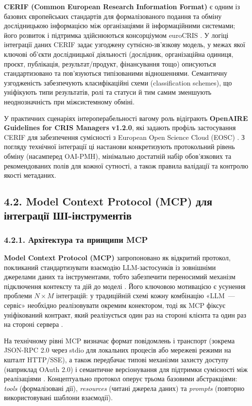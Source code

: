 \textbf{CERIF (Common European Research Information Format)} є одним із базових європейських стандартів для формалізованого подання та обміну дослідницькою інформацією між організаціями й інформаційними системами; його розвиток і підтримка здійснюються консорціумом euroCRIS \cite{euroCRIS2024CERIF}. У логіці інтеграції даних CERIF задає узгоджену сутнісно-зв'язкову модель, у межах якої ключові об'єкти дослідницької діяльності (дослідник, організаційна одиниця, проєкт, публікація, результат/продукт, фінансування тощо) описуються стандартизовано та пов'язуються типізованими відношеннями. Семантичну узгодженість забезпечують класифікаційні схеми (classification schemes), що уніфікують типи результатів, ролі та статуси й тим самим зменшують неоднозначність при міжсистемному обміні.

У практичних сценаріях інтероперабельності вагому роль відіграють \textbf{OpenAIRE Guidelines for CRIS Managers v1.2.0}, які задають профіль застосування CERIF для забезпечення сумісності з European Open Science Cloud (EOSC) \cite{OpenAIRE2023GuidelinesCRIS}. З погляду технічної інтеграції ці настанови конкретизують протокольний рівень обміну (насамперед OAI-PMH), мінімально достатній набір обов'язкових та рекомендованих полів для кожної сутності, а також правила валідації та контролю якості метаданих.

\subsection*{4.2. Model Context Protocol (MCP) для інтеграції ШІ-інструментів}

\subsubsection*{4.2.1. Архітектура та принципи MCP}

\textbf{Model Context Protocol (MCP)} запропоновано як відкритий протокол, покликаний стандартизувати взаємодію LLM-застосунків із зовнішніми джерелами даних та інструментами, тобто забезпечити переносимий механізм підключення контексту та дій до моделі \cite{Anthropic2024MCP}. Його ключовою мотивацією є усунення проблеми $N\times M$ інтеграцій: у традиційній схемі кожну комбінацію «LLM~--- сервіс» необхідно реалізовувати окремим конектором, тоді як MCP фіксує уніфікований контракт, який реалізується один раз на стороні клієнта та один раз на стороні сервера \cite{Anthropic2024MCP}.

На технічному рівні MCP визначає формат повідомлень і транспорт (зокрема JSON-RPC 2.0 через stdio для локальних процесів або мережеві режими на кшталт HTTP/SSE), а також передбачає типові механізми захисту доступу (наприклад OAuth 2.0) і семантичне версіонування для підтримки сумісності між реалізаціями \cite{Anthropic2024MCP}. Концептуально протокол оперує трьома базовими абстракціями: \textit{tools} (формалізовані дії), \textit{resources} (читані джерела даних) та \textit{prompts} (повторно використовувані шаблони взаємодії).

